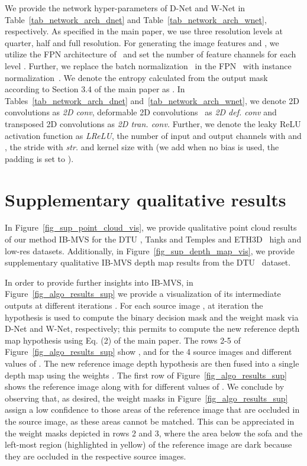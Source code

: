 \documentclass{bmvc2k}
\begin{document}
We provide the network hyper-parameters of D-Net and W-Net in Table~\ref{tab_network_arch_dnet} and Table~\ref{tab_network_arch_wnet}, respectively.
As specified in the main paper, we use three resolution levels  at quarter, half and full resolution. For generating the image features  and , we utilize the FPN architecture of~\cite{casmvs} and set the number of feature channels for each level . Further, we replace the batch normalization~\cite{batch_norm} in the FPN~\cite{casmvs} with instance normalization~\cite{instance_norm}. 
We denote the entropy calculated from the output mask  according to Section 3.4 of the main paper as . In Tables~\ref{tab_network_arch_dnet} and~\ref{tab_network_arch_wnet}, we denote 2D convolutions as \textit{2D conv}, deformable 2D convolutions~\cite{deform_convsv2} as \textit{2D def. conv} and transposed 2D convolutions as \textit{2D tran. conv.} Further, we denote the leaky ReLU activation function as \textit{LReLU}, the number of input and output channels with  and , the stride with \textit{str.} and kernel size with  (we add  when no bias is used, the padding is set to ). 

\section{Supplementary qualitative results}

In Figure~\ref{fig_sup_point_cloud_vis}, we provide qualitative point cloud results of our method IB-MVS for the DTU \cite{dtu}, Tanks and Temples \cite{tanksandtemples} and ETH3D~\cite{eth3d} high and low-res datasets. Additionally, in Figure~\ref{fig_sup_depth_map_vis}, we provide supplementary qualitative IB-MVS depth map results from the DTU~\cite{dtu} dataset. 

In order to provide further insights into IB-MVS, in Figure~\ref{fig_algo_results_sup} we provide a visualization of its intermediate outputs at different iterations .
For each source image , at iteration  the hypothesis  is used to compute the binary decision mask  and the weight mask  via D-Net and W-Net, respectively; this permits to compute the new reference depth map hypothesis  using Eq. (2) of the main paper.
The rows 2-5 of Figure~\ref{fig_algo_results_sup} show ,  and  for the 4 source images and different values of .
The new reference image depth hypothesis  are then fused into a single depth map  using the weights .
The first row of Figure~\ref{fig_algo_results_sup} shows the reference image along with  for different values of .
We conclude by observing that, as desired, the weight masks in Figure~\ref{fig_algo_results_sup} assign a low confidence to those areas of the reference image that are occluded in the source image, as these areas cannot be matched.
This can be appreciated in the weight masks  depicted in rows 2 and 3, where the area below the sofa and the left-most region (highlighted in yellow) of the reference image are dark because they are occluded in the respective source images.
\end{document}
